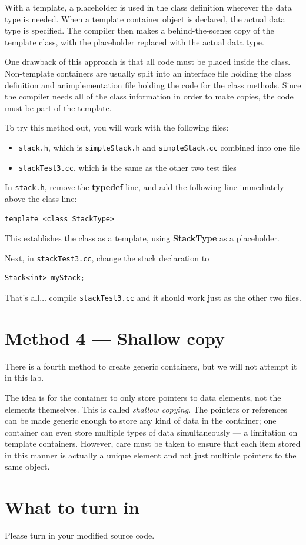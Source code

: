 \documentclass{article}
\begin{document}
With a template, a placeholder is used in the class definition wherever the data
type is needed. When a template container object is declared, the actual data
type is specified. The compiler then makes a behind-the-scenes copy of the
template class, with the placeholder replaced with the actual data type.\parend

One drawback of this approach is that all code must be placed inside the class.
Non-template containers are usually split into an interface file holding the
class definition and animplementation file holding the code for the class
methods. Since the compiler needs all of the class information in order to make
copies, the code must be part of the template.\parend

To try this method out, you will work with the following files:
\begin{itemize}
  \item {\tt stack.h}, which is {\tt simpleStack.h} and {\tt simpleStack.cc}
  combined into one file
  \item {\tt stackTest3.cc}, which is the same as the other two test files
\end{itemize}
In {\tt stack.h}, remove the {\bf typedef} line, and add the following line
immediately above the class line:
\begin{lstlisting}
template <class StackType>
\end{lstlisting}
This establishes the class as a template, using {\bf StackType} as a
placeholder.\parend

Next, in {\tt stackTest3.cc}, change the stack declaration to
\begin{lstlisting}
Stack<int> myStack;
\end{lstlisting}
That's all$\ldots$ compile {\tt stackTest3.cc} and it should work just as the
other two files.\parend

\section{Method 4 --- Shallow copy}
There is a fourth method to create generic containers, but we will not attempt
it in this lab.\parend

The idea is for the container to only store pointers to data elements, not the
elements themselves. This is called \emph{shallow copying}. The pointers or
references can be made generic enough to store any kind of data in the
container; one container can even store multiple types of data simultaneously
--- a limitation on template containers. However, care must be taken to ensure
that each item stored in this manner is actually a unique element and not just
multiple pointers to the same object.

\section{What to turn in}
Please turn in your modified source code.
\end{document}
